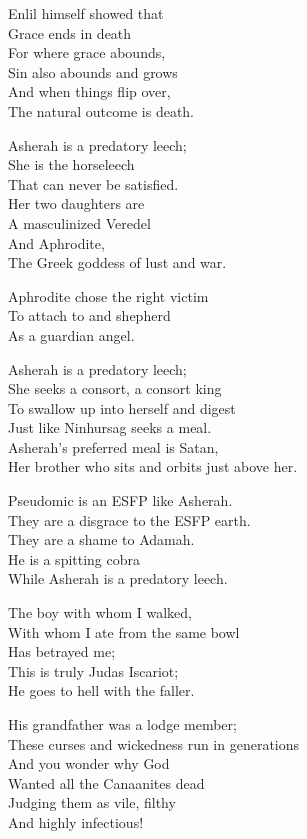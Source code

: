 \documentclass[
]{book}
\begin{document}
Enlil himself showed that\\
Grace ends in death\\
For where grace abounds,\\
Sin also abounds and grows\\
And when things flip over,\\
The natural outcome is death.

Asherah is a predatory leech;\\
She is the horseleech\\
That can never be satisfied.\\
Her two daughters are\\
A masculinized Veredel\\
And Aphrodite,\\
The Greek goddess of lust and war.

Aphrodite chose the right victim\\
To attach to and shepherd\\
As a guardian angel.

Asherah is a predatory leech;\\
She seeks a consort, a consort king\\
To swallow up into herself and digest\\
Just like Ninhursag seeks a meal.\\
Asherah's preferred meal is Satan,\\
Her brother who sits and orbits just above her.

Pseudomic is an ESFP like Asherah.\\
They are a disgrace to the ESFP earth.\\
They are a shame to Adamah.\\
He is a spitting cobra\\
While Asherah is a predatory leech.

The boy with whom I walked,\\
With whom I ate from the same bowl\\
Has betrayed me;\\
This is truly Judas Iscariot;\\
He goes to hell with the faller.

His grandfather was a lodge member;\\
These curses and wickedness run in generations\\
And you wonder why God\\
Wanted all the Canaanites dead\\
Judging them as vile, filthy\\
And highly infectious!
\end{document}
